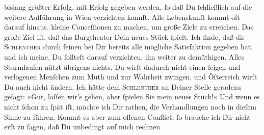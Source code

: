 \begin{ledgroupsized}[t]{13cm}
{{{                  bislang größter Erfolg.}}}\label{K_L02893-3h}{ }{\pb}mit Erfolg gegeben werden, ſo daß Du ſchließlich
               auf die weitere Aufführung in Wien verzichten
               kannſt. Alle Lebenskunſt kommt oft darauf hinaus\textcolor{gray}{,} kleine
               Conceſſionen zu machen, um große Ziele zu erreichen. Das große Ziel iſt, daß das Burgtheater Dein neues Stück ſpielt. Ich finde, daß dir \textsc{Schlenther} durch ſeinen \label{K_L02893-4v}\label{K_L02893-4h} bei Dir bereits alle mögliche Satisfaktion gegeben hat, und ich meine, Du
               ſollteſt darauf verzichten, ihn weiter zu demüthigen. Alles Sturmlaufen \strikeout{\textcolor{gray}{nu}} nützt übrigens nichts. Du wirſt dadurch nicht einen feigen und verlogenen
               Menſchen zum Muth und zur Wahrheit  zwingen, und Öſterreich wirſt Du auch
               nicht ändern. Ich hätte dem \textsc{Schlenther} an Deiner Stelle geradezu geſagt: »Gut, laſſen wir’s gehen, aber ſpielen Sie
               mein neues Stück!« Und {\pb}wenn es nicht ſchon zu ſpät iſt, möchte ich Dir
               rathen, die Verhandlungen noch in dieſem Sinne zu führen. Kommt es aber zum offenen
               Conflict, ſo brauche ich Dir nicht erſt zu ſagen, daß Du unbedingt auf mich rechnen

\end{ledgroupsized}
